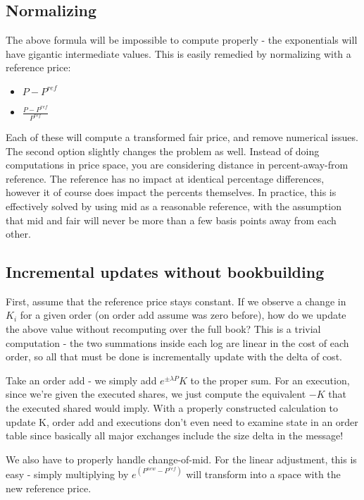 \documentclass[]{article}
\begin{document}
	
	\subsection{Normalizing}
	The above formula will be impossible to compute properly - the exponentials will have gigantic intermediate values. This is easily remedied by normalizing with a reference price:
	
	\begin{itemize}
		\item $P - P^{ref}$
		\item $\frac{P - P^{ref}}{{P^{ref}}}$
	\end{itemize}
	
	Each of these will compute a transformed fair price, and remove numerical issues. The second option slightly changes the problem as well. Instead of doing computations in price space, you are considering distance in percent-away-from reference. The reference has no impact at identical percentage differences,
	however it of course does impact the percents themselves. In practice, this is effectively solved by using mid as a reasonable reference, with the assumption that mid and fair will never be more than a few basis points away from each other.
	
	\subsection{Incremental updates without bookbuilding}
	
	First, assume that the reference price stays constant. If we observe a change in $K_i$ for a given order (on order add assume was zero before), how do we update the above value without recomputing over the full book? This is a trivial computation - the two summations inside each log are linear in the cost of each order, so all that must be done is incrementally update with the delta of cost.
	
	Take an order add - we simply add $e^{\pm \lambda P} K$ to the proper sum. For an execution, since we're given the executed shares, we just compute the equivalent $-K$ that the executed shared would imply. With a properly constructed calculation to update K, order add and executions don't even need to examine state in an order table since basically all major exchanges include the size delta in the message!
	
	We also have to properly handle change-of-mid. For the linear adjustment, this is easy - simply multiplying by $e^(P^{new}-P^{ref})$ will transform into a space with the new reference price.
	
\end{document}
